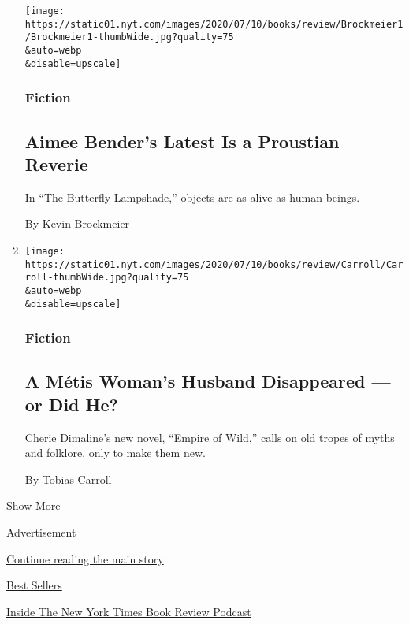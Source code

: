 \begin{enumerate}
  \texttt{[image: https://static01.nyt.com/images/2020/07/10/books/review/Brockmeier1/Brockmeier1-thumbWide.jpg?quality=75\\\&auto=webp\\\&disable=upscale]}

  \hypertarget{fiction}{%
  \subsubsection{Fiction}\label{fiction}}

  \hypertarget{aimee-benders-latest-is-a-proustian-reverie}{%
  \subsection{Aimee Bender's Latest Is a Proustian
  Reverie}\label{aimee-benders-latest-is-a-proustian-reverie}}

  In ``The Butterfly Lampshade,'' objects are as alive as human beings.

  By Kevin Brockmeier
\item
  \href{/2020/07/28/books/review/empire-of-wild-cherie-dimaline.html}{}

  \texttt{[image: https://static01.nyt.com/images/2020/07/10/books/review/Carroll/Carroll-thumbWide.jpg?quality=75\\\&auto=webp\\\&disable=upscale]}

  \hypertarget{fiction-1}{%
  \subsubsection{Fiction}\label{fiction-1}}

  \hypertarget{a-muxe9tis-womans-husband-disappeared--or-did-he}{%
  \subsection{A Métis Woman's Husband Disappeared --- or Did
  He?}\label{a-muxe9tis-womans-husband-disappeared--or-did-he}}

  Cherie Dimaline's new novel, ``Empire of Wild,'' calls on old tropes
  of myths and folklore, only to make them new.

  By Tobias Carroll
\end{enumerate}

Show More

Advertisement

\protect\hyperlink{after-mid2}{Continue reading the main story}

\href{https://www.nytimes.com/best-sellers-books/overview.html}{Best
Sellers}

\href{https://www.nytimes.com/column/book-review-podcast}{Inside The New
York Times Book Review Podcast}

